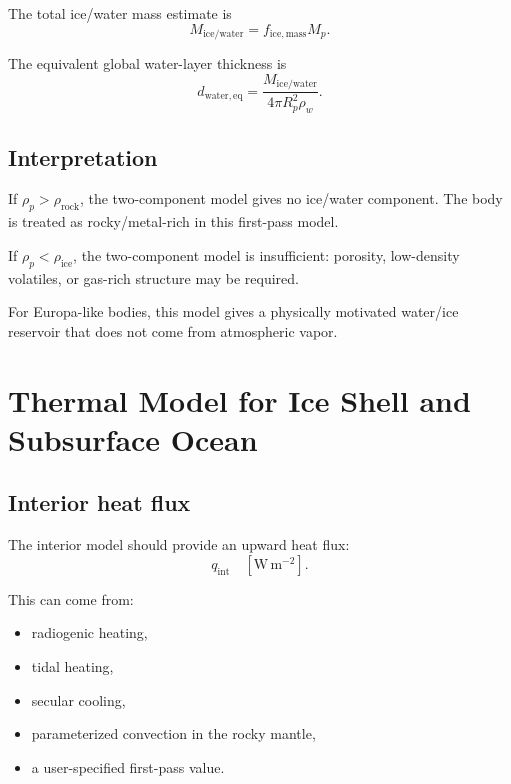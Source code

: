 \documentclass[11pt]{article}
\begin{document}
The total ice/water mass estimate is
\begin{equation}
    M_{\mathrm{ice/water}}
    =
    f_{\mathrm{ice,mass}} M_p.
\end{equation}

The equivalent global water-layer thickness is
\begin{equation}
    d_{\mathrm{water,eq}}
    =
    \frac{M_{\mathrm{ice/water}}}
    {4\pi R_p^2 \rho_w}.
\end{equation}

\subsection{Interpretation}

If $\rho_p > \rho_{\mathrm{rock}}$, the two-component model gives no ice/water
component. The body is treated as rocky/metal-rich in this first-pass model.

If $\rho_p < \rho_{\mathrm{ice}}$, the two-component model is insufficient:
porosity, low-density volatiles, or gas-rich structure may be required.

For Europa-like bodies, this model gives a physically motivated water/ice
reservoir that does not come from atmospheric vapor.

\section{Thermal Model for Ice Shell and Subsurface Ocean}

\subsection{Interior heat flux}

The interior model should provide an upward heat flux:
\begin{equation}
    q_{\mathrm{int}}\quad [\mathrm{W\,m^{-2}}].
\end{equation}

This can come from:
\begin{itemize}
    \item radiogenic heating,
    \item tidal heating,
    \item secular cooling,
    \item parameterized convection in the rocky mantle,
    \item a user-specified first-pass value.
\end{itemize}
\end{document}
